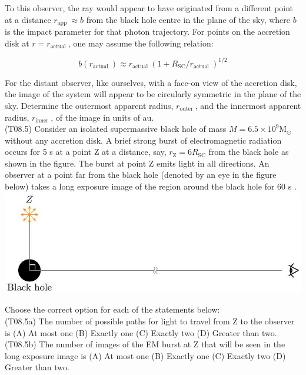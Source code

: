 \documentclass[10pt]{article}
\begin{document}
    To this observer, the ray would appear to have originated from a different point at a distance $r_{\text {app }} \approx b$ from the black hole centre in the plane of the sky, where $b$ is the impact parameter for that photon trajectory. For points on the accretion disk at $r=r_{\text {actual }}$, one may assume the following relation:
    
    $$
    b\left(r_{\text {actual }}\right) \approx r_{\text {actual }}\left(1+R_{\mathrm{SC}} / r_{\text {actual }}\right)^{1 / 2}
    $$
    
    For the distant observer, like ourselves, with a face-on view of the accretion disk, the image of the system will appear to be circularly symmetric in the plane of the sky. Determine the outermost apparent radius, $r_{\text {outer }}$, and the innermost apparent radius, $r_{\text {inner }}$, of the image in units of au.\\
    (T08.5) Consider an isolated supermassive black hole of mass $M=6.5 \times 10^{9} \mathrm{M}_{\odot}$ without any accretion disk. A brief strong burst of electromagnetic radiation occurs for 5 s at a point Z at a distance, say, $r_{\mathrm{Z}}=6 R_{\mathrm{SC}}$ from the black hole as shown in the figure. The burst at point Z emits light in all directions. An observer at a point far from the black hole (denoted by an eye in the figure below) takes a long exposure image of the region around the black hole for 60 s .\\
    \includegraphics[max width=\textwidth, center]{2025_08_23_e94579452776a99c4850g-09}
    
    Choose the correct option for each of the statements below:\\
    (T08.5a) The number of possible paths for light to travel from Z to the observer is (A) At most one (B) Exactly one (C) Exactly two (D) Greater than two.\\
    (T08.5b) The number of images of the EM burst at Z that will be seen in the long exposure image is (A) At most one (B) Exactly one (C) Exactly two (D) Greater than two.\\
\end{document}
